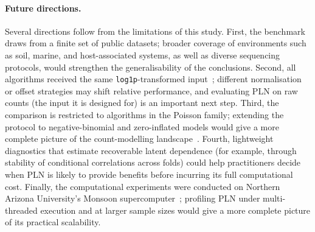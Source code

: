 \documentclass{jmlr}
\begin{document}
\paragraph{Future directions.}
Several directions follow from the limitations of this study.
First, the benchmark draws from a finite set of public datasets; broader coverage of environments such as soil, marine, and host-associated systems, as well as diverse sequencing protocols, would strengthen the generalisability of the conclusions.
Second, all algorithms received the same \texttt{log1p}-transformed input~\cite{doi:10.1128/mSystems.00016-19}; different normalisation or offset strategies may shift relative performance, and evaluating PLN on raw counts (the input it is designed for) is an important next step.
Third, the comparison is restricted to algorithms in the Poisson family; extending the protocol to negative-binomial and zero-inflated models would give a more complete picture of the count-modelling landscape~\cite{10.1038/s41598-024-76513-8,10.1101/538579,10.1093/bioadv/vbae167,Champion2024OneNet}.
Fourth, lightweight diagnostics that estimate recoverable latent dependence (for example, through stability of conditional correlations across folds) could help practitioners decide when PLN is likely to provide benefits before incurring its full computational cost.
Finally, the computational experiments were conducted on Northern Arizona University’s Monsoon supercomputer~\cite{Buechler2025MonsoonIntro}; profiling PLN under multi-threaded execution and at larger sample sizes would give a more complete picture of its practical scalability.


\end{document}
